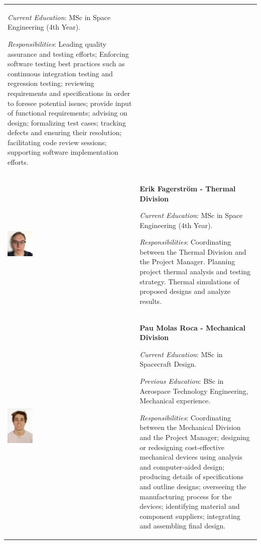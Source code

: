 \documentclass[a4paper,12pt,twoside]{article}
\begin{document}
\begin{longtable}[]{m{} m{}}
\smallskip
\textit{Current Education}: MSc in Space Engineering (4th Year).

\smallskip
\textit{Responsibilities}: Leading quality assurance and testing efforts; Enforcing software testing best practices such as continuous integration testing and regression testing; reviewing requirements and specifications in order to foresee potential issues; provide input of functional requirements; advising on design; formalizing test cases; tracking defects and ensuring their resolution; facilitating code review sessions; supporting software implementation efforts.     
\bigskip
\\


\includegraphics[width=0.2\textwidth]{1-introduction/img/erik-fagerstrom.jpg} & \textbf{Erik Fagerström - Thermal Division}

\smallskip
\textit{Current Education}: MSc in Space Engineering (4th Year).


\smallskip
\textit{Responsibilities}: Coordinating between the Thermal Division and the Project Manager. Planning project thermal analysis and testing strategy. Thermal simulations of proposed designs and analyze results.
\bigskip
\\


\includegraphics[width=0.2\textwidth]{1-introduction/img/pau-molas-roca.jpg} & \textbf{Pau Molas Roca - Mechanical Division}

\smallskip
\textit{Current Education}: MSc in Spacecraft Design.

\smallskip
\textit{Previous Education}: BSc in Aerospace Technology Engineering, Mechanical experience.

\smallskip
\textit{Responsibilities}: Coordinating between the Mechanical Division and the Project Manager; designing or redesigning cost-effective mechanical devices using analysis and computer-aided design; producing details of specifications and outline designs; overseeing the manufacturing process for the devices; identifying material and component suppliers; integrating and assembling final design.   \bigskip
\\



\end{longtable}
\end{document}
